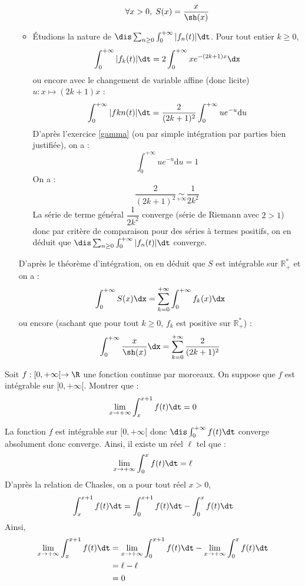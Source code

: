 \documentclass[a4paper,10pt]{report}
\begin{document}
\begin{enumerate}
\begin{itemize}
$$ \forall x >0, \; S(x) = \dfrac{x}{\sh(x)}$$
\item Étudions la nature de $\dis \sum_{n \geq 0} \int_{0}^{+ \infty} \vert f_n(t) \vert \dt$. Pour tout entier $k \geq 0$,
$$ \int_0^{+ \infty} \vert f_k(t) \vert \dt = 2 \int_0^{+\infty} x e^{-(2k+1)x} \dx$$
ou encore avec le changement de variable affine (donc licite) $u : x \mapsto (2k+1)x$ :
$$  \int_0^{+ \infty} \vert fkn(t) \vert \dt = \dfrac{2}{(2k+1)^2} \int_0^{+\infty} u e^{-u} \textrm{d}u$$
D'après l'exercice \ref{gamma} (ou par simple intégration par parties bien justifiée), on a :
$$ \int_0^{+\infty} u e^{-u} \textrm{d}u = 1$$
On a :
$$ \dfrac{2}{(2k+1)^2} \underset{+ \infty}{\sim} \dfrac{1}{2k^2}$$
La série de terme général $\dfrac{1}{2k^2}$ converge (série de Riemann avec $2>1$) donc par critère de comparaison pour des séries à termes positifs, on en déduit que $\dis \sum_{n \geq 0} \int_{0}^{+ \infty} \vert f_n(t) \vert \dt$ converge.
\end{itemize}
D'après le théorème d'intégration, on en déduit que $S$ est intégrable sur $\mathbb{R}_+^*$ et on a :
$$ \int_0^{+ \infty} S(x) \dx = \sum_{k=0}^{+ \infty} \int_0^{+ \infty} f_k(x) \dx$$
ou encore (sachant que pour tout $k \geq 0$, $f_k$ est positive sur $\mathbb{R}_+^*$) :
$$ \int_0^{+ \infty} \dfrac{x}{\sh(x)} \dx = \sum_{k=0}^{+ \infty} \dfrac{2}{(2k+1)^2}$$
\end{enumerate}

\begin{Exa}  Soit $f :[0, + \infty[ \rightarrow \R$ une fonction continue par morceaux.  On suppose que $f$ est intégrable sur $[0, + \infty[$.  Montrer que :
  \[
  \lim_{x \rightarrow + \infty} \int_{x}^{x + 1} f(t) \dt =0 
  \]
\end{Exa}

\corr La fonction $f$ est intégrable sur $[0, + \infty[$ donc $\dis \int_0^{+ \infty} f(t) \dt$ converge absolument donc converge. Ainsi, il existe un réel $\ell$ tel que :
$$ \lim_{x \rightarrow + \infty} \int_0^x f(t) \dt = \ell$$
D'après la relation de Chasles, on a pour tout réel $x>0$,
$$ \int_{x}^{x + 1} f(t) \dt = \int_{0}^{x + 1} f(t) \dt - \int_{0}^{x} f(t) \dt $$
Ainsi,
\begin{align*}
\lim_{x \rightarrow + \infty} \int_{x}^{x + 1} f(t) \dt & =\lim_{x \rightarrow + \infty}  \int_{0}^{x + 1} f(t) \dt - \lim_{x \rightarrow + \infty} \int_{0}^{x} f(t) \dt \\
& = \ell - \ell \\
& = 0
\end{align*}
\end{document}
